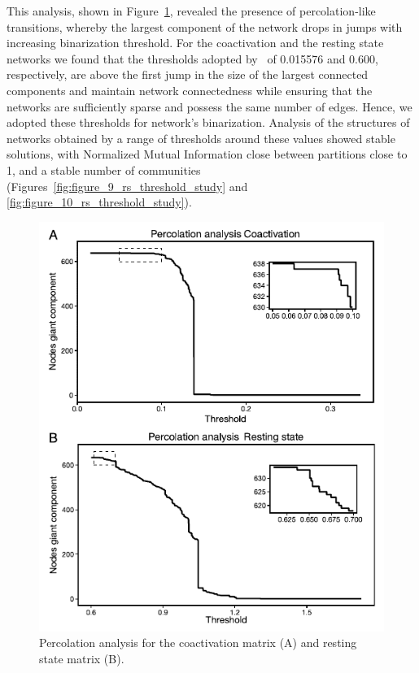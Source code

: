 This analysis, shown in Figure~\ref{fig:figure_8_percolation_analysis}, revealed the presence of percolation-like transitions, whereby the largest component of the network drops in jumps with increasing binarization threshold. For the coactivation and the resting state networks we found that the thresholds adopted by~\cite{crossley2013a} of 0.015576 and 0.600, respectively, are above the first jump in the size of the largest connected components and maintain network connectedness while ensuring that the networks are sufficiently sparse and possess the same number of edges. Hence, we adopted these thresholds for network's binarization. Analysis of the structures of networks obtained by a range of thresholds around these values showed stable solutions, with Normalized Mutual Information close between partitions close to 1, and a stable number of communities (Figures~\ref{fig:figure_9_rs_threshold_study} and \ref{fig:figure_10_rs_threshold_study}).

\begin{figure}[htb!]
\centering
\includegraphics[width=0.7\linewidth]{images/figure_8_percolation_analysis_compressed.pdf}
\caption{Percolation analysis for the coactivation matrix (A) and resting state matrix (B).}
\label{fig:figure_8_percolation_analysis}
\end{figure}

